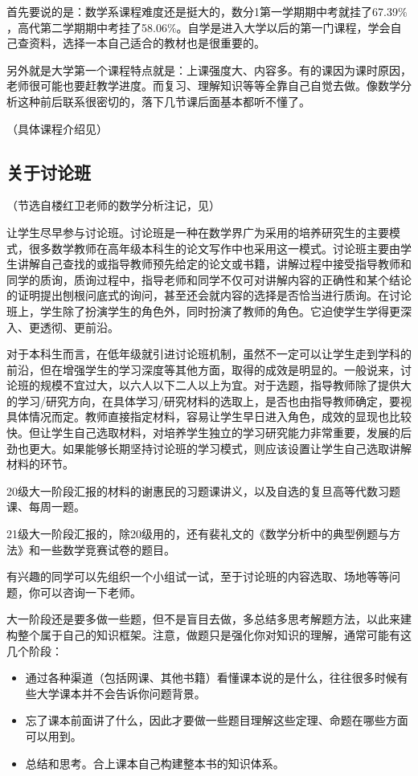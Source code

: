 \documentclass{my_paper}
\begin{document}
首先要说的是：数学系课程难度还是挺大的，数分1第一学期期中考就挂了67.39$\%$，高代第二学期期中考挂了58.06$\%$。\textcolor[rgb]{1,0,0}{自学}是进入大学以后的第一门课程，学会自己查资料，选择一本自己适合的教材也是很重要的。

另外就是大学第一个课程特点就是：上课强度大、内容多。有的课因为课时原因，老师很可能也要赶教学进度。而复习、理解知识等等全靠自己自觉去做。像数学分析这种前后联系很密切的，落下几节课后面基本都听不懂了。

（具体课程介绍见）

   \subsection{关于讨论班}\label{s}
（节选自楼红卫老师的数学分析注记，见）

让学生尽早参与讨论班。讨论班是一种在数学界广为采用的培养研究生的主要模式，很多数学教师在高年级本科生的论文写作中也采用这一模式。讨论班主要\textcolor[rgb]{1,0,0}{由学生讲解}自己查找的或指导教师预先给定的论文或书籍，讲解过程中接受指导教师和同学的\textcolor[rgb]{1,0,0}{质询}，质询过程中，指导老师和同学不仅可对讲解内容的正确性和某个结论的证明提出刨根问底式的询问，甚至还会就内容的选择是否恰当进行质询。在讨论班上，学生除了扮演学生的角色外，同时扮演了教师的角色。它迫使学生学得更深入、更透彻、更前沿。

    对于本科生而言，在低年级就引进讨论班机制，虽然不一定可以让学生走到学科的前沿，但在增强学生的学习深度等其他方面，取得的成效是明显的。一般说来，讨论班的规模不宜过大，以六人以下二人以上为宜。对于选题，指导教师除了提供大的学习/研究方向，在具体学习/研究材料的选取上，是否也由指导教师确定，要视具体情况而定。教师直接指定材料，容易让学生早日进入角色，成效的显现也比较快。但让学生自己选取材料，对培养学生独立的学习研究能力非常重要，发展的后劲也更大。如果能够长期坚持讨论班的学习模式，则应该设置让学生自己选取讲解材料的环节。
    
20级大一阶段汇报的材料的谢惠民的习题课讲义，以及自选的复旦高等代数习题课、每周一题。

21级大一阶段汇报的，除20级用的，还有裴礼文的《数学分析中的典型例题与方法》和一些数学竞赛试卷的题目。

有兴趣的同学可以先\textcolor[rgb]{1,0,0}{组织一个小组}试一试，至于讨论班的内容选取、场地等等问题，你可以咨询一下老师。

大一阶段还是要多做一些题，但不是盲目去做，多总结多思考解题方法，以此来建构整个属于自己的知识框架。注意，做题只是强化你对知识的理解，通常可能有这几个阶段：
\begin{itemize}
    \item 通过各种渠道（包括网课、其他书籍）看懂课本说的是什么，往往很多时候有些大学课本并不会告诉你问题背景。
    \item 忘了课本前面讲了什么，因此才要做一些题目理解这些定理、命题在哪些方面可以用到。
    \item 总结和思考。合上课本自己构建整本书的知识体系。
\end{itemize}
\end{document}

